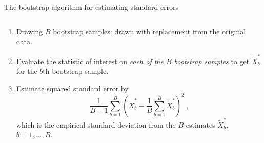 \documentclass[10pt,ignorenonframetext,]{beamer}
\providecommand{\tightlist}{%
  \setlength{\itemsep}{0pt}\setlength{\parskip}{0pt}}
\begin{document}
\begin{frame}

\begin{block}{The bootstrap algorithm for estimating standard errors}

\(~\)

\begin{enumerate}
\tightlist
\item
  Drawing \(B\) bootstrap samples: drawn with replacement from the
  original data.
\end{enumerate}

\vspace{2mm}

\begin{enumerate}
\setcounter{enumi}{1}
\tightlist
\item
  Evaluate the statistic of interest on \emph{each of the \(B\)
  bootstrap samples} to get \(\tilde{X}^*_b\) for the \(b\)th bootstrap
  sample.
\end{enumerate}

\vspace{2mm}

\begin{enumerate}
\setcounter{enumi}{2}
\tightlist
\item
  Estimate squared standard error by
  \[\frac{1}{B-1}\sum_{b=1}^B (\tilde{X}^*_b-\frac{1}{B}\sum_{b=1}^B \tilde{X}^*_b)^2 \ ,\]
  which is the empirical standard deviation from the \(B\) estimates
  \(\tilde{X}^*_b\), \(b=1,\ldots,B\).
\end{enumerate}

\end{block}

\end{frame}
\end{document}
